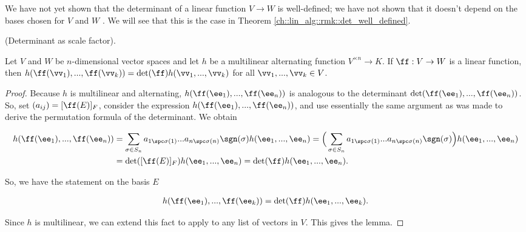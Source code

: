 

\begin{remark}
    We have not yet shown that the determinant of a linear function $V \rightarrow W$ is well-defined; we have not shown that it doesn't depend on the bases chosen for $V$ and $W$ . We will see that this is the case in Theorem \ref{ch::lin_alg::rmk::det_well_defined}.
\end{remark}

\begin{lemma}
\label{ch::lin_alg::lemma:det_as_scale_factor}
    (Determinant as scale factor).

    Let $V$ and $W$ be $n$-dimensional vector spaces and let $h$ be a multilinear alternating function $V^{\times n} \rightarrow K$. If $\ff:V \rightarrow W$ is a linear function, then $h(\ff(\vv_1), ..., \ff(\vv_k)) = \det(\ff) h(\vv_1, ..., \vv_k)$ for all $\vv_1, ..., \vv_k \in V$.
\end{lemma}

\begin{proof}
     Because $h$ is multilinear and alternating, $h(\ff(\ee_1), ..., \ff(\ee_n))$ is analogous to the determinant $\det(\ff(\ee_1), ..., \ff(\ee_n))$. So, set $(a_{ij}) = [\ff(E)]_F$, consider the expression $h(\ff(\ee_1), ..., \ff(\ee_n))$, and use essentially the same argument as was made to derive the permutation formula of the determinant. We obtain
    
    \begin{align*}
        h(\ff(\ee_1), ...,
        \ff(\ee_n)) 
        &= \sum_{\sigma \in S_n} a_{1 \spc \sigma(1)} ... a_{n \spc \sigma(n)} \sgn(\sigma) h(\ee_1, ..., \ee_n)
        = \Big( \sum_{\sigma \in S_n} a_{1 \spc \sigma(1)} ... a_{n \spc \sigma(n)} \sgn(\sigma) \Big) h(\ee_1, ..., \ee_n) \\
        &= \det([\ff(E)]_F) h(\ee_1, ..., \ee_n)
        = \det(\ff) h(\ee_1, ..., \ee_n).
    \end{align*}
    
   So, we have the statement on the basis $E$
   
   \begin{align*}
        h(\ff(\ee_1), ..., 
        \ff(\ee_k)) = \det(\ff) h(\ee_1, ..., \ee_k).
   \end{align*}
   
   Since $h$ is multilinear, we can extend this fact to apply to any list of vectors in $V$. This gives the lemma.
\end{proof}

